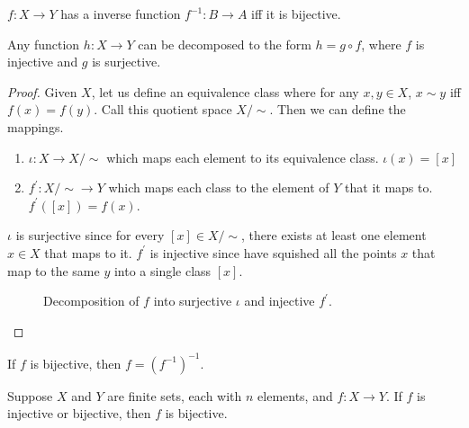   \begin{corollary}
    $f: X \rightarrow Y$ has a inverse function $f^{-1}: B \rightarrow A$ iff it is bijective. 
  \end{corollary}

  \begin{corollary}[Decomposition]
    Any function $h: X \rightarrow Y$ can be decomposed to the form $h = g \circ f$, where $f$ is injective and $g$ is surjective. 

  \end{corollary}
  \begin{proof}
    Given $X$, let us define an equivalence class where for any $x, y \in X$, $x \sim y$ iff $f(x) = f(y)$. Call this quotient space $X / \sim$. Then we can define the mappings. 
    \begin{enumerate}
      \item $\iota: X \rightarrow X / \sim$ which maps each element to its equivalence class. $\iota(x) = [x]$
      \item $f^\prime: X / \sim \rightarrow Y$ which maps each class to the element of $Y$ that it maps to. $f^\prime ([x]) = f(x)$. 
    \end{enumerate}
    $\iota$ is surjective since for every $[x] \in X / \sim$, there exists at least one element $x \in X$ that maps to it. $f^\prime$ is injective since have squished all the points $x$ that map to the same $y$ into a single class $[x]$. 

    \begin{figure}[H]
      \centering 
      \caption{Decomposition of $f$ into surjective $\iota$ and injective $f^\prime$. } 
      \label{fig:decomposition}
    \end{figure}
  \end{proof}

  \begin{theorem}
    If $f$ is bijective, then $f = (f^{-1})^{-1}$. 
  \end{theorem}

  \begin{theorem}
    Suppose $X$ and $Y$ are finite sets, each with $n$ elements, and $f: X \rightarrow Y$. If $f$ is injective or bijective, then $f$ is bijective. 
  \end{theorem} 

